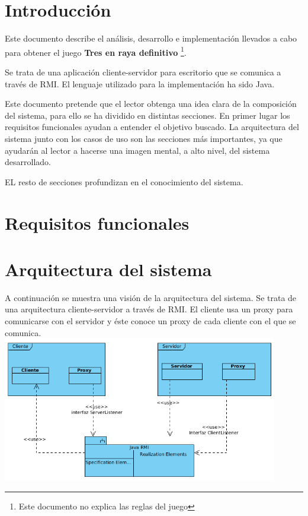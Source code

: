 \documentclass[a4paper,11pt,oneside]{article}
\begin{document}

\clearpage
\section{Introducción}

Este documento describe el análisis, desarrollo e implementación llevados a cabo para obtener
el juego \textbf{Tres en raya definitivo} \footnote{Este documento no explica las reglas del juego}.

Se trata de una aplicación cliente-servidor para escritorio que se comunica a través de RMI.
El lenguaje utilizado para la implementación ha sido Java.

Este documento pretende que el lector obtenga una idea clara de la composición del sistema, para ello
se ha dividido en distintas secciones. En primer lugar los requisitos funcionales ayudan a entender el objetivo
buscado. La arquitectura del sistema junto con los casos de uso son las secciones más importantes, ya
que ayudarán al lector a hacerse una imagen mental, a alto nivel, del sistema desarrollado.

EL resto de secciones profundizan en el conocimiento del sistema.

\clearpage

\pagestyle{fancy}

\section{Requisitos funcionales}
 
%
\clearpage
\section{Arquitectura del sistema}

A continuación se muestra una visión de la arquitectura del sistema. Se trata de
una arquitectura cliente-servidor a través de RMI. El cliente usa un
proxy para comunicarse con el servidor y éste conoce un proxy de cada cliente con el
que se comunica.
\\
\includegraphics[width=0.9\textwidth]{img/arquitectura/arquitectura.png}\\[1cm]
\end{document}
